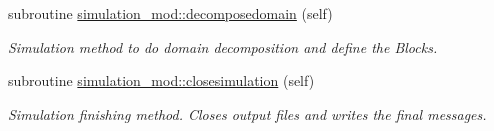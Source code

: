 \begin{DoxyCompactItemize}
subroutine \mbox{\hyperlink{namespacesimulation__mod_a2b8198a9fb3f7671c6b45192a0b9740c}{simulation\+\_\+mod\+::decomposedomain}} (self)
\begin{DoxyCompactList}\small\item\em Simulation method to do domain decomposition and define the Blocks. \end{DoxyCompactList}\item 
subroutine \mbox{\hyperlink{namespacesimulation__mod_a4285722eaa589fa671233554b54c74f8}{simulation\+\_\+mod\+::closesimulation}} (self)
\begin{DoxyCompactList}\small\item\em Simulation finishing method. Closes output files and writes the final messages. \end{DoxyCompactList}\end{DoxyCompactItemize}
